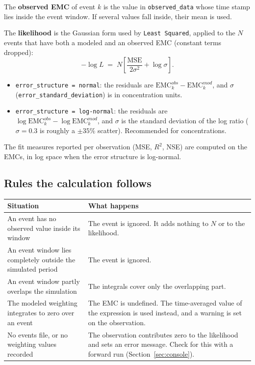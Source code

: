 \documentclass[11pt,a4paper]{article}
\newcommand{\code}[1]{\texttt{\small #1}}
\begin{document}
The \textbf{observed EMC} of event $k$ is the value in \code{observed\_data} whose
time stamp lies inside the event window. If several values fall inside, their mean
is used.

The \textbf{likelihood} is the Gaussian form used by \code{Least Squared}, applied
to the $N$ events that have both a modeled and an observed EMC (constant terms
dropped):
\begin{equation}
  -\log L \;=\; N\left[\frac{\mathrm{MSE}}{2\sigma^2} + \log\sigma\right].
\end{equation}
\begin{itemize}[leftmargin=1.4em]
  \item \code{error\_structure = normal}: the residuals are
        $\mathrm{EMC}^{obs}_k-\mathrm{EMC}^{mod}_k$, and $\sigma$
        (\code{error\_standard\_deviation}) is in concentration units.
  \item \code{error\_structure = log-normal}: the residuals are
        $\log\mathrm{EMC}^{obs}_k-\log\mathrm{EMC}^{mod}_k$, and $\sigma$ is the
        standard deviation of the log ratio ($\sigma=0.3$ is roughly a
        $\pm35\%$ scatter). Recommended for concentrations.
\end{itemize}
The fit measures reported per observation (MSE, $R^2$, NSE) are computed on the
EMCs, in log space when the error structure is log-normal.

\subsection*{Rules the calculation follows}
\begin{longtable}{>{\raggedright\arraybackslash}p{}>{\raggedright\arraybackslash}p{}}
\toprule
Situation & What happens \\
\midrule
An event has no observed value inside its window & The event is ignored. It adds nothing to $N$ or to the likelihood. \\
An event window lies completely outside the simulated period & The event is ignored. \\
An event window partly overlaps the simulation & The integrals cover only the overlapping part. \\
The modeled weighting integrates to zero over an event & The EMC is undefined. The time-averaged value of the expression is used instead, and a warning is set on the observation. \\
No events file, or no weighting values recorded & The observation contributes zero to the likelihood and sets an error message. Check for this with a forward run (Section~\ref{sec:console}). \\
\bottomrule
\end{longtable}
\end{document}
